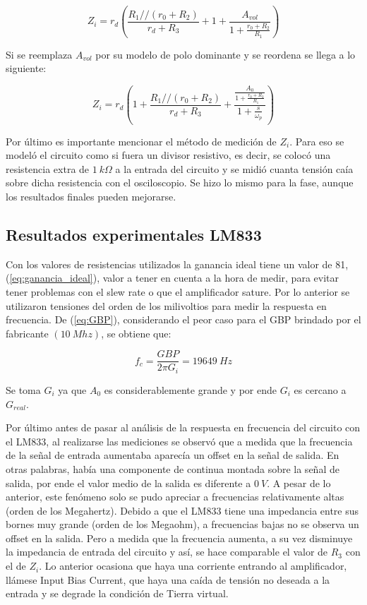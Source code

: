 \begin{equation}\label{eq:zin_real}
Z_i = r_d \left(\frac{R_1 // (r_0 + R_2)}{r_d + R_3} + 1 + \frac{A_{vol}}{1 + \frac{r_0 + R_2}{R_1}} \right)
\end{equation}

Si se reemplaza $A_{vol}$ por su modelo de polo dominante y se reordena se llega a lo siguiente:

\begin{equation}\label{eq:zin_completa}
Z_i = r_d \left(1 + \frac{R_1 // (r_0 + R_2)}{r_d + R_3} + \frac{\frac{A_0}{1 + \frac{r_0 + R_2}{R_1}}}{1 + \frac{s}{\omega_p}}\right)
\end{equation}

Por último es importante mencionar el método de medición de $Z_i$. Para eso se modeló el circuito como si fuera un divisor resistivo, es decir, se colocó una resistencia extra de $1 \ k\Omega$ a la entrada del circuito y se midió cuanta tensión caía sobre dicha resistencia con el osciloscopio. Se hizo lo mismo para la fase, aunque los resultados finales pueden mejorarse. 


\subsection{Resultados experimentales LM833}

Con los valores de resistencias utilizados la ganancia ideal tiene un valor de 81, (\ref{eq:ganancia_ideal}), valor a tener en cuenta a la hora de medir, para evitar tener problemas con el slew rate o que el amplificador sature. Por lo anterior se utilizaron tensiones del orden de los milivoltios para medir la respuesta en frecuencia. De (\ref{eq:GBP}), considerando el peor caso para el GBP brindado por el fabricante $(10 \ Mhz)$, se obtiene que:

\begin{equation}\label{eq:frecuencia_corte_LM833}
f_c = \frac{GBP}{2\pi G_i} = 19649 \ Hz
\end{equation} 

Se toma $G_i$ ya que $A_0$ es considerablemente grande y por ende $G_i$ es cercano a $G_{real}$. 


Por último antes de pasar al análisis de la respuesta en frecuencia del circuito con el LM833, al realizarse las mediciones se observó que a medida que la frecuencia de la señal de entrada aumentaba aparecía un offset en la señal de salida. En otras palabras, había una componente de continua montada sobre la señal de salida, por ende el valor medio de la salida es diferente a $0 \ V$. A pesar de lo anterior, este fenómeno solo se pudo apreciar a frecuencias relativamente altas (orden de los Megahertz). Debido a que el LM833 tiene una impedancia entre sus bornes muy grande (orden de los Megaohm), a frecuencias bajas no se observa un offset en la salida. Pero a medida que la frecuencia aumenta, a su vez disminuye la impedancia de entrada del circuito y así, se hace comparable el valor de $R_3$ con el de $Z_i$. Lo anterior ocasiona que haya una corriente entrando al amplificador, llámese Input Bias Current, que haya una caída de tensión no deseada a la entrada y se degrade la condición de Tierra virtual. 

